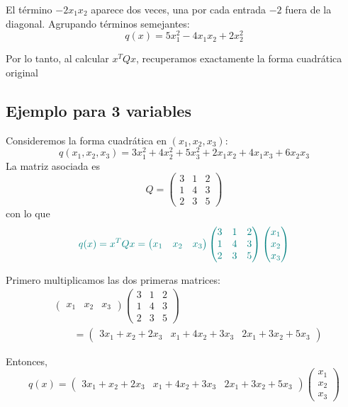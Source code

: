 \documentclass{article}
\begin{document}
El término \(-2x_1x_2\) aparece dos veces, una por cada entrada \(-2\) fuera de la diagonal. Agrupando términos semejantes:
\[
q(x)
=
5x_1^2
-4x_1x_2
+2x_2^2
\]

{\color{teal}
Por lo tanto, al calcular \(x^TQx\), recuperamos exactamente la forma cuadrática original}

\subsection*{Ejemplo para 3 variables}
Consideremos la forma cuadrática en \((x_1,x_2,x_3)\):
\[
q(x_1,x_2,x_3)
= 3x_1^2 + 4x_2^2 + 5x_3^2
+ 2x_1x_2 + 4x_1x_3 + 6x_2x_3
\]
La matriz asociada es
\[
Q = \begin{pmatrix}
3 & 1 & 2\\
1 & 4 & 3\\
2 & 3 & 5
\end{pmatrix}
\]
con lo que
\[\color{teal}
q(x) = x^T Q x
= \begin{pmatrix}x_1 & x_2 & x_3\end{pmatrix}
\begin{pmatrix}
3 & 1 & 2\\
1 & 4 & 3\\
2 & 3 & 5
\end{pmatrix}
\begin{pmatrix}x_1\\ x_2\\ x_3\end{pmatrix}
\]

Primero multiplicamos las dos primeras matrices:
\[
\begin{aligned}
&\begin{pmatrix}x_1 & x_2 & x_3\end{pmatrix}
\begin{pmatrix}
3 & 1 & 2\\
1 & 4 & 3\\
2 & 3 & 5
\end{pmatrix}\\
&\qquad=
\begin{pmatrix}
3x_1+x_2+2x_3
&
x_1+4x_2+3x_3
&
2x_1+3x_2+5x_3
\end{pmatrix}
\end{aligned}
\]

Entonces,
\[
q(x)
=
\begin{pmatrix}
3x_1+x_2+2x_3
&
x_1+4x_2+3x_3
&
2x_1+3x_2+5x_3
\end{pmatrix}
\begin{pmatrix}
x_1\\
x_2\\
x_3
\end{pmatrix}
\]
\end{document}
